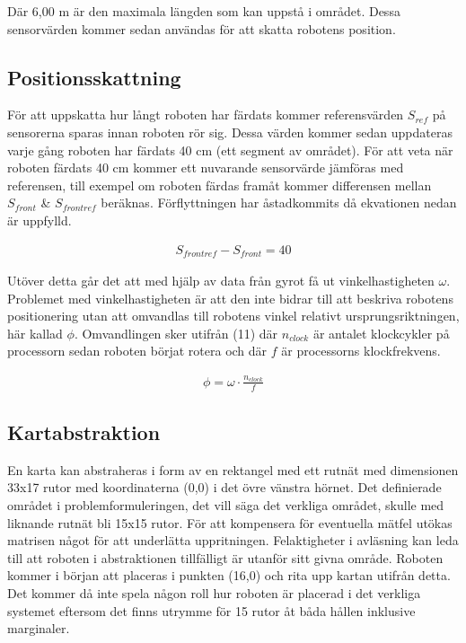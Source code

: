 \documentclass[a4paper,12pt,fleqn]{article}
\begin{document}
Där 6,00 m är den maximala längden som kan uppstå i området. Dessa sensorvärden kommer sedan användas för att skatta robotens position.



\subsection{Positionsskattning}

För att uppskatta hur långt roboten har färdats kommer referensvärden $S_{ref}$ på sensorerna sparas innan roboten rör sig. Dessa värden kommer sedan uppdateras varje gång roboten har färdats 40 cm (ett segment av området). För att veta när roboten färdats 40 cm kommer ett nuvarande sensorvärde jämföras med referensen, till exempel om roboten färdas framåt kommer differensen mellan $S_{front}$ \& $S_{frontref}$ beräknas. Förflyttningen har åstadkommits då ekvationen nedan är uppfylld. 

\begin{gather}
	S_{frontref} - S_{front} = 40
\end{gather}

Utöver detta går det att med hjälp av data från gyrot få ut vinkelhastigheten $\omega$. Problemet med vinkelhastigheten är att den inte bidrar till att beskriva robotens positionering utan att omvandlas till robotens vinkel relativt ursprungsriktningen, här kallad $\phi$. Omvandlingen sker utifrån (11) där $n_{clock}$ är antalet klockcykler på processorn sedan roboten börjat rotera och där $f$ är processorns klockfrekvens.

\begin{gather}
	\phi = \omega \cdot \frac{n_{clock}}{f}
\end{gather} 

\subsection{Kartabstraktion}

En karta kan abstraheras i form av en rektangel med ett rutnät med dimensionen 33x17 rutor med koordinaterna (0,0) i det övre vänstra hörnet. Det definierade området i problemformuleringen, det vill säga det verkliga området, skulle med liknande rutnät bli 15x15 rutor. För att kompensera för eventuella mätfel utökas matrisen något för att underlätta uppritningen. Felaktigheter i avläsning kan leda till att roboten i abstraktionen tillfälligt är utanför sitt givna område. Roboten kommer i början att placeras i punkten (16,0) och rita upp kartan utifrån detta. Det kommer då inte spela någon roll hur roboten är placerad i det verkliga systemet eftersom det finns utrymme för 15 rutor åt båda hållen inklusive marginaler. 
\end{document}
